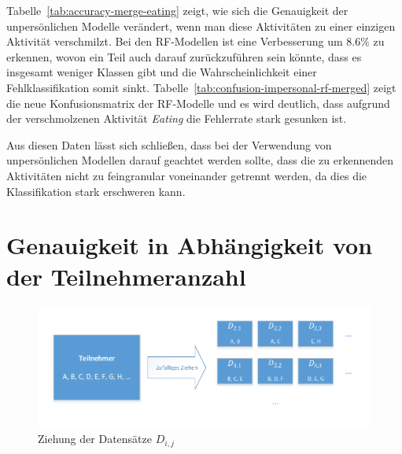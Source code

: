 Tabelle~\ref{tab:accuracy-merge-eating} zeigt, wie sich die Genauigkeit der unpersönlichen Modelle verändert, wenn man diese Aktivitäten zu einer einzigen Aktivität verschmilzt. Bei den RF-Modellen ist eine Verbesserung um $8.6 \%$ zu erkennen, wovon ein Teil auch darauf zurückzuführen sein könnte, dass es insgesamt weniger Klassen gibt und die Wahrscheinlichkeit einer Fehlklassifikation somit sinkt. Tabelle~\ref{tab:confusion-impersonal-rf-merged} zeigt die neue Konfusionsmatrix der RF-Modelle und es wird deutlich, dass aufgrund der verschmolzenen Aktivität \textit{Eating} die Fehlerrate stark gesunken ist.

Aus diesen Daten lässt sich schließen, dass bei der Verwendung von unpersönlichen Modellen darauf geachtet werden sollte, dass die zu erkennenden Aktivitäten nicht zu feingranular voneinander getrennt werden, da dies die Klassifikation stark erschweren kann.

\section{Genauigkeit in Abhängigkeit von der Teilnehmeranzahl}
\begin{figure}
\centering
\includegraphics[clip, trim=7mm 7mm 7mm 6mm, width=\textwidth]{img/random-set-draw}
\caption{Ziehung der Datensätze $D_{i,j}$}
\label{fig:random-set-draw}
\end{figure}

